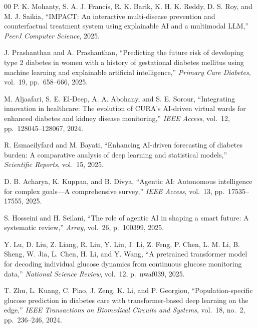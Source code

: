\documentclass[conference]{IEEEtran}
\begin{document}
\begin{thebibliography}{00}
 P. K. Mohanty, S. A. J. Francis, R. K. Barik, K. H. K. Reddy, D. S. Roy, and M. J. Saikia, ``IMPACT: An interactive multi-disease prevention and counterfactual treatment system using explainable AI and a multimodal LLM,'' \textit{PeerJ Computer Science}, 2025.

 J. Prashanthan and A. Prashanthan, ``Predicting the future risk of developing type 2 diabetes in women with a history of gestational diabetes mellitus using machine learning and explainable artificial intelligence,'' \textit{Primary Care Diabetes}, vol.~19, pp.~658--666, 2025.

 M. Aljaafari, S. E. El-Deep, A. A. Abohany, and S. E. Sorour, ``Integrating innovation in healthcare: The evolution of CURA's AI-driven virtual wards for enhanced diabetes and kidney disease monitoring,'' \textit{IEEE Access}, vol.~12, pp.~128045--128067, 2024.

 R. Esmaeilyfard and M. Bayati, ``Enhancing AI-driven forecasting of diabetes burden: A comparative analysis of deep learning and statistical models,'' \textit{Scientific Reports}, vol.~15, 2025.

 D. B. Acharya, K. Kuppan, and B. Divya, ``Agentic AI: Autonomous intelligence for complex goals---A comprehensive survey,'' \textit{IEEE Access}, vol.~13, pp.~17535--17555, 2025.

 S. Hosseini and H. Seilani, ``The role of agentic AI in shaping a smart future: A systematic review,'' \textit{Array}, vol.~26, p.~100399, 2025.

 Y. Lu, D. Liu, Z. Liang, R. Liu, Y. Liu, J. Li, Z. Feng, P. Chen, L. M. Li, B. Sheng, W. Jia, L. Chen, H. Li, and Y. Wang, ``A pretrained transformer model for decoding individual glucose dynamics from continuous glucose monitoring data,'' \textit{National Science Review}, vol.~12, p.~nwaf039, 2025.

 T. Zhu, L. Kuang, C. Piao, J. Zeng, K. Li, and P. Georgiou, ``Population-specific glucose prediction in diabetes care with transformer-based deep learning on the edge,'' \textit{IEEE Transactions on Biomedical Circuits and Systems}, vol.~18, no.~2, pp.~236--246, 2024.

\end{thebibliography}
\end{document}
